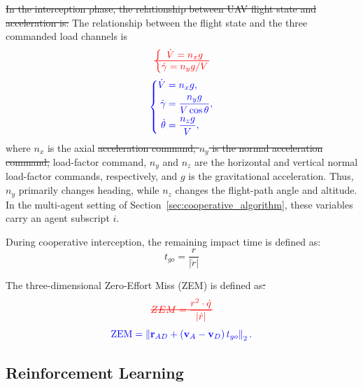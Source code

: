 \documentclass[lettersize,journal]{IEEEtran}
\newcommand{\hladd}[1]{{\color{blue}#1}}
\newcommand{\hldel}[1]{{\color{red}\sout{#1}}}
\newcommand{\hldeleq}[1]{%
  {\color{red}%
   \sbox0{$\displaystyle #1$}%
   \rlap{\usebox0}%
   \rule[0.5\dimexpr\ht0-\dp0\relax]{\wd0}{0.6pt}}}
\begin{document}
\hldel{In the interception phase, the relationship between UAV flight state and acceleration is:}%
\hladd{The relationship between the flight state and the three commanded load channels is}
\begin{equation}
\label{guozai}
\hldeleq{\left\{\begin{matrix}\dot{V} =n_{x} g \\
\dot{\gamma} =n_{y}g/V \end{matrix}\right.}
\end{equation}
\begin{equation}
\label{guozai3d}
{\color{blue}\left\{\begin{aligned}
\dot{V}&=n_x g,\\
\dot{\gamma}&=\frac{n_y g}{V\cos\theta},\\
\dot{\theta}&=\frac{n_z g}{V},
\end{aligned}\right.}
\end{equation}
where $n_{x}$ is the axial \hldel{acceleration command, $n_{y}$ is the normal acceleration command,}%
\hladd{load-factor command, $n_y$ and $n_z$ are the horizontal and vertical normal load-factor
commands, respectively,} and $g$ is the gravitational acceleration.
\hladd{Thus, $n_y$ primarily changes heading, while $n_z$ changes the flight-path angle and
altitude.}
In the multi-agent setting of Section~\ref{sec:cooperative_algorithm}, these variables carry
an agent subscript $i$.

During cooperative interception, the remaining impact time is defined as:
\begin{equation}
\label{shijian}
t_{go}=\frac{r}{\left|\dot{r}\right|}
\end{equation}

The \hladd{three-dimensional} Zero-Effort Miss (ZEM) is defined as\hldel{:}
\begin{equation}
\label{ZEM}
\hldeleq{ZEM = \frac{r^{2}\cdot\dot{q}}{\left|\dot{r}\right|}}
\end{equation}
\begin{equation}
\label{ZEM3d}
{\color{blue}\operatorname{ZEM}=\left\|\mathbf{r}_{AD}+(\mathbf{v}_A-\mathbf{v}_D)\,t_{go}\right\|_2.}
\end{equation}

\subsection{Reinforcement Learning}
\end{document}
